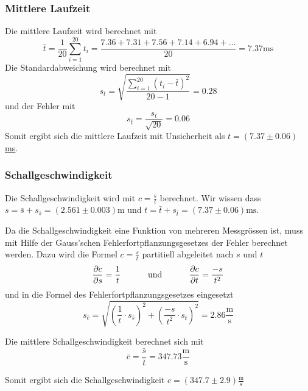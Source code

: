 \subsubsection*{Mittlere Laufzeit}

Die mittlere Laufzeit wird berechnet mit
\[ \bar{t} = \frac{1}{20} \sum_{i=1}^{20} t_i = \frac{7.36+7.31+7.56+7.14+6.94+\ldots}{20} = 7.37 \textrm{ms} \]
Die Standardabweichung wird berechnet mit
\[ s_t = \sqrt{ \frac{ \sum_{i=1}^{20} (t_i - \bar{t})^2 }{20-1} } = 0.28\]
und der Fehler mit
\[ s_{\bar{t}} = \frac{s_t}{\sqrt{20}} = 0.06 \]
Somit ergibt sich die mittlere Laufzeit mit Unsicherheit als \underline{\underline{$t = (7.37 \pm 0.06)$ ms}}.

\subsubsection*{Schallgeschwindigkeit}

Die Schallgeschwindigkeit wird mit $c=\frac{s}{t}$ berechnet. Wir wissen dass $s=\bar{s}+s_{\bar{s}}=(2.561 \pm 0.003) \textrm{m} $ und $t=\bar{t}+s_{\bar{t}}=(7.37 \pm 0.06) \textrm{ms} $.

Da die Schallgeschwindigkeit eine Funktion von mehreren Messgr\"{o}ssen ist, muss mit Hilfe der
Gauss'schen Fehlerfortpflanzungsgesetzes der Fehler berechnet werden. Dazu wird die Formel $c=\frac{s}{t}$
partitiell abgeleitet nach $s$ und $t$
\[ \frac{\partial c}{\partial s} = \frac{1}{t} \textrm{\hspace{10mm} und \hspace{10mm}} \frac{\partial c}{\partial{t}} = \frac{-s}{t^2} \]
und in die Formel des Fehlerfortpflanzungsgesetzes eingesetzt
\[ s_{\bar{c}} = \sqrt{(\frac{1}{t} \cdot s_{\bar{s}})^2 + (\frac{-s}{t^2} \cdot s_{\bar{t}})^2} = 2.86 \frac{\textrm{m}}{\textrm{s}} \]

Die mittlere Schallgeschwindigkeit berechnet sich mit
\[ \bar{c}=\frac{\bar{s}}{\bar{t}} = 347.73 \frac{\textrm{m}}{\textrm{s}} \]

Somit ergibt sich die Schallgeschwindigkeit \underline{\underline{$c=(347.7 \pm 2.9) \frac{\textrm{m}}{\textrm{s}}$}}

